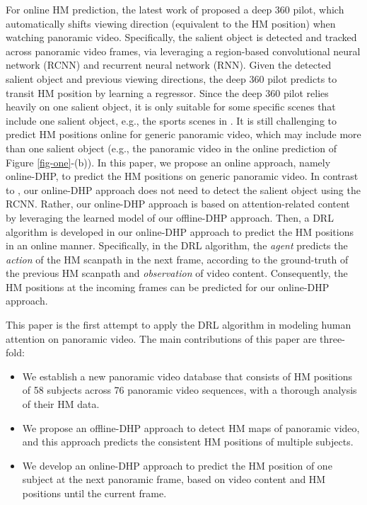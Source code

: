 \documentclass[10pt,journal,compsoc]{IEEEtran}
\begin{document}
For online HM prediction, the latest work of \cite{hu2017deep} proposed a deep 360 pilot, which automatically shifts viewing direction (equivalent to the HM position) when watching panoramic video. Specifically, the salient object is detected and tracked across panoramic video frames, via leveraging a region-based convolutional neural network (RCNN) \cite{ren2015faster} and recurrent neural network (RNN). Given the detected salient object and previous viewing directions, the deep 360 pilot predicts to transit HM position by learning a regressor. Since the deep 360 pilot relies heavily on one salient object, it is only suitable for some specific scenes that include one salient object, e.g., the sports scenes in \cite{hu2017deep}. It is still challenging to predict HM positions online for generic panoramic video, which may include more than one salient object (e.g., the panoramic video in the online prediction of Figure \ref{fig-one}-(b)). In this paper, we propose an online approach, namely online-DHP, to predict the HM positions on generic panoramic video. In contrast to \cite{hu2017deep}, our online-DHP approach does not need to detect the salient object using the RCNN. Rather, our online-DHP approach is based on attention-related content by leveraging the learned model of our offline-DHP approach. Then, a DRL algorithm is developed in our online-DHP approach to predict the HM positions in an online manner. Specifically, in the DRL algorithm, the \textit{agent} predicts the \textit{action} of the HM scanpath in the next frame, according to the ground-truth of the previous HM scanpath and \textit{observation} of video content. Consequently, the HM positions at the incoming frames can be predicted for our online-DHP approach.


This paper is the first attempt to apply the DRL algorithm in modeling human attention on panoramic video. The main contributions of this paper are three-fold:
\begin{itemize}
\item We establish a new panoramic video database that consists of HM positions of 58 subjects  across 76 panoramic video sequences, with a thorough analysis of their HM data.

\item We propose an offline-DHP approach to detect HM maps of panoramic video, and this approach predicts the consistent HM positions of multiple subjects.

\item We develop an online-DHP approach to predict the HM position of one subject at the next panoramic frame, based on video content and HM positions until the current frame.

\end{itemize}
\end{document}

